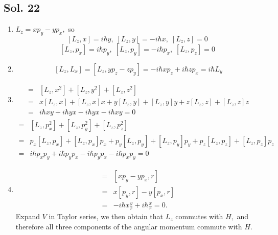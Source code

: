    \subsection*{Sol. 22}
   \begin{enumerate}
       \item 
       $L_z=xp_y-yp_x,$
   so 
   $$
   [L_z, x]=i\hbar y,\;
   [L_z, y]=-i\hbar x,\;
   [L_z, z]=0\;
   $$
   $$
   [L_z, p_x]=i\hbar p_y,\;
   [L_z, p_y]=-i\hbar p_x,\;
   [L_z, p_z]=0\;
   $$
   \item 
   $$
   [L_z,L_x]
   =[L_z, yp_z-zp_y]
   =-i\hbar xp_z
   +i\hbar zp_x
   =i\hbar L_y
   $$
   \item 
   \begin{align*}
   [L_z, r^2]
   =&
   [L_z, x^2] + 
   [L_z, y^2] + 
   [L_z, z^2]\\
   =&x[L_z, x] + [L_z,x]x+
   y[L_z, y] + [L_z,y]y+
   z[L_z, z] + [L_z,z]z\\
   =&i\hbar xy+
   i\hbar yx
   -i\hbar yx 
   -i\hbar xy  = 0
   \end{align*}
   \begin{align*}
   [L_z, p^2]
   =&
   [L_z, p_x^2] + 
   [L_z, p_y^2] + 
   [L_z, p_z^2]\\
   =&p_x[L_z, p_x] + [L_z,p_x]p_x+
   p_y[L_z, p_y] + [L_z,p_y]p_y+
   p_z[L_z, p_z] + [L_z,p_z]p_z\\
   =&i\hbar p_xp_y+
   i\hbar p_yp_x
   -i\hbar p_yp_x 
   -i\hbar p_xp_y  = 0
   \end{align*}
   \item 
   \begin{align*}
       [L_z, r] =& [xp_y - yp_x, r]\\
       =&x[p_y,r]-y[p_x,r]\\
       =&-i\hbar x\frac{y}{r} +i\hbar \frac{x}{r} = 0.
   \end{align*}
   Expand $V$ in Taylor series, we then obtain that $L_z$ commutes with $H,$ and therefore all three components of the angular momentum commute with $H.$
   
   \end{enumerate}


